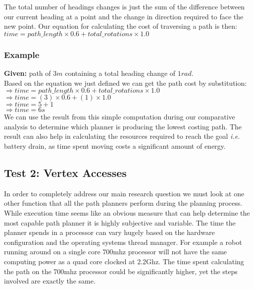 \noindent
The total number of headings changes is just the sum of the difference between our current heading at a point and the change in direction required to face the new point. Our equation for calculating the cost of traversing a path is then: \\

\indent $time = path\_length \times 0.6 + total\_rotations \times 1.0$ \\

\newpage

\subsubsection{Example}

\noindent
\textbf{Given:} path of $3m$ containing a total heading change of $1rad$. \\

\noindent
Based on the equation we just defined we can get the path cost by substitution: \\

\indent $\Rightarrow time = path\_length \times 0.6 + total\_rotations \times 1.0$ \\
\indent $\Rightarrow time = (3) \times 0.6 + (1) \times 1.0$ \\
\indent $\Rightarrow time = 5 + 1$ \\
\indent $\Rightarrow time = 6s$ \\

\noindent
We can use the result from this simple computation during our comparative analysis to determine which planner is producing the lowest costing path. The result can also help in calculating the resources required to reach the goal \textit{i.e.} battery drain, as time spent moving costs a significant amount of energy.

\subsection{Test 2: Vertex Accesses}

\noindent
In order to completely address our main research question we must look at one other function that all the path planners perform during the planning process.  
While execution time seems like an obvious measure that can help determine the most capable path planner it is highly subjective and variable. The time the planner spends in a processor can vary hugely based on the hardware configuration and the operating systems thread manager. For example a robot running around on a single core 700mhz processor will not have the same computing power as a quad core clocked at 2.2Ghz. The time spent calculating the path on the 700mhz processor could be significantly higher, yet the steps involved are exactly the same. \\

